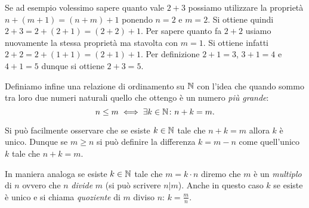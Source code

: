 Se ad esempio volessimo sapere quanto vale $2+3$ possiamo utilizzare 
la proprietà $n+(m+1) = (n+m)+1$ ponendo $n=2$ e $m=2$.
Si ottiene quindi $2+3 = 2+(2+1) = (2+2)+1$.
Per sapere quanto fa $2+2$ usiamo nuovamente la stessa proprietà 
ma stavolta con $m=1$. 
Si ottiene infatti $2+2=2+(1+1)=(2+1)+1$.
Per definizione $2+1=3$, $3+1=4$ e $4+1=5$ dunque si ottiene $2+3=5$.

Definiamo infine una relazione di ordinamento su ${\mathbb N}$ 
con l'idea che quando sommo tra loro due numeri naturali 
quello che ottengo è un numero \emph{più grande}:
\[
   n\le m \iff \exists k\in {\mathbb N} \colon n+k = m.
\]

Si può facilmente osservare che se esiste $k\in {\mathbb N}$ tale che $n+k=m$
allora $k$ è unico. 
Dunque se $m\ge n$ si può definire la differenza $k=m-n$
come quell'unico $k$ tale che $n+k=m$.

In maniera analoga se esiste $k\in {\mathbb N}$ tale che $m=k\cdot n$
diremo che $m$ è un \emph{multiplo} di $n$ 
ovvero che $n$ \emph{divide} $m$ (si può scrivere $n\vert m$).
Anche in questo caso $k$ se esiste è unico e si 
chiama \emph{quoziente} di $m$ diviso $n$: $k=\frac m n$.

